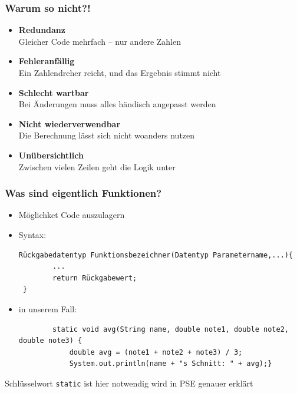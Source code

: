 \documentclass{../../presentation}
\begin{document}
\begin{frame}[fragile]
	\frametitle{Warum so nicht?!}
	\begin{itemize}
		\item\pause \textbf{Redundanz} \\
		      Gleicher Code mehrfach – nur andere Zahlen

		\item\pause \textbf{Fehleranfällig} \\
		      Ein Zahlendreher reicht, und das Ergebnis stimmt nicht

		\item\pause \textbf{Schlecht wartbar} \\
		      Bei Änderungen muss alles händisch angepasst werden

		\item\pause \textbf{Nicht wiederverwendbar} \\
		      Die Berechnung lässt sich nicht woanders nutzen

		\item\pause \textbf{Unübersichtlich} \\
		      Zwischen vielen Zeilen geht die Logik unter
	\end{itemize}
	\vspace{2em}
	\begin{minipage}{\textwidth}
		\centering
		\onslide\pause{\Huge $\rightarrow$~}%
	\end{minipage}
\end{frame}

\begin{frame}[fragile]
	\frametitle{Was sind eigentlich Funktionen?}
	\begin{itemize}
		\item\pause  Möglichket Code auszulagern
		\item\pause Syntax:
		      \begin{verbatim}   
Rückgabedatentyp Funktionsbezeichner(Datentyp Parametername,...){
        ...
        return Rückgabewert;
 }
        \end{verbatim}
		\item\pause in unserem Fall:
		      \begin{verbatim}
        static void avg(String name, double note1, double note2, double note3) {
            double avg = (note1 + note2 + note3) / 3;
            System.out.println(name + "s Schnitt: " + avg);}
            \end{verbatim}
	\end{itemize}
	Schlüsselwort \texttt{static} ist hier notwendig wird in PSE genauer erklärt
\end{frame}
\end{document}
